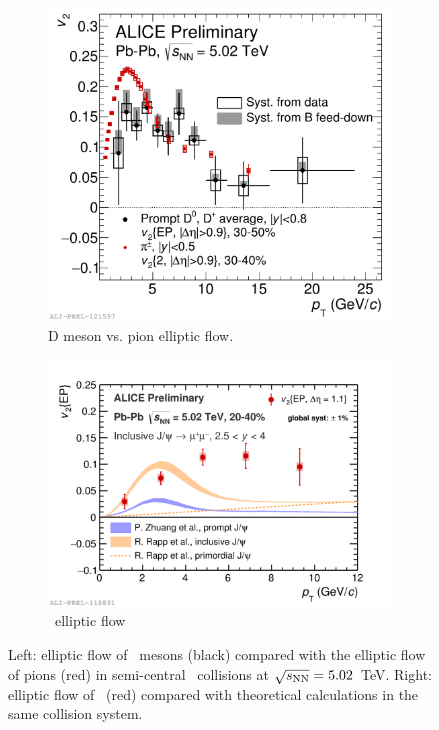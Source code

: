 \documentclass[10pt]{article}
\begin{document}
\begin{figure}[tb]
\centering
\begin{subfigure}[b]{0.43\textwidth}
  \centering
  \includegraphics[width=1.0\linewidth]{img/2017-Feb-02-D0DplusAveragev2_Comparison_with_pions_3040}
  \caption{D meson vs. pion elliptic flow.}
  \label{fig:v2d0}
\end{subfigure} \quad
\begin{subfigure}[b]{0.53\textwidth}
  \centering
  \includegraphics[width=1.0\linewidth]{img/2017-Feb-03-jpsiv2_theory}
  \caption{\jpsi\ elliptic flow}
  \label{fig:v2jpsi}
\end{subfigure} \quad
\caption{Left: elliptic flow of \Dzero\ mesons (black) compared with the elliptic flow of pions (red) in semi-central \PbPb\ collisions at $\sqrt{s_{\rm NN}}=5.02$~TeV. Right: elliptic flow of \jpsi\ (red) compared with theoretical calculations in the same collision system.}
\end{figure}
\end{document}
